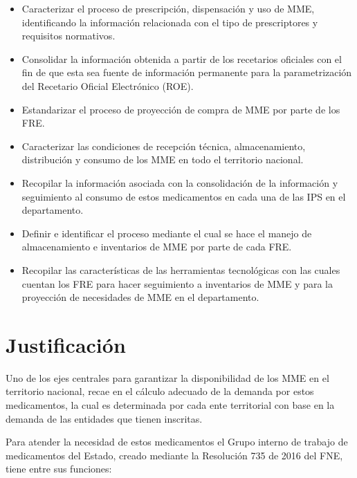 \documentclass[
]{book}
\begin{document}
\begin{itemize}
\item
  Caracterizar el proceso de prescripción, dispensación y uso de MME, identificando la información relacionada con el tipo de prescriptores y requisitos normativos.
\item
  Consolidar la información obtenida a partir de los recetarios oficiales con el fin de que esta sea fuente de información permanente para la parametrización del Recetario Oficial Electrónico (ROE).
\item
  Estandarizar el proceso de proyección de compra de MME por parte de los FRE.
\item
  Caracterizar las condiciones de recepción técnica, almacenamiento, distribución y consumo de los MME en todo el territorio nacional.
\item
  Recopilar la información asociada con la consolidación de la información y seguimiento al consumo de estos medicamentos en cada una de las IPS en el departamento.
\item
  Definir e identificar el proceso mediante el cual se hace el manejo de almacenamiento e inventarios de MME por parte de cada FRE.
\item
  Recopilar las características de las herramientas tecnológicas con las cuales cuentan los FRE para hacer seguimiento a inventarios de MME y para la proyección de necesidades de MME en el departamento.
\end{itemize}

\hypertarget{justificaciuxf3n}{%
\chapter{Justificación}\label{justificaciuxf3n}}

Uno de los ejes centrales para garantizar la disponibilidad de los MME en el territorio nacional, recae en el cálculo adecuado de la demanda por estos medicamentos, la cual es determinada por cada ente territorial con base en la demanda de las entidades que tienen inscritas.

Para atender la necesidad de estos medicamentos el Grupo interno de trabajo de medicamentos del Estado, creado mediante la Resolución 735 de 2016 del FNE, tiene entre sus funciones:
\end{document}
